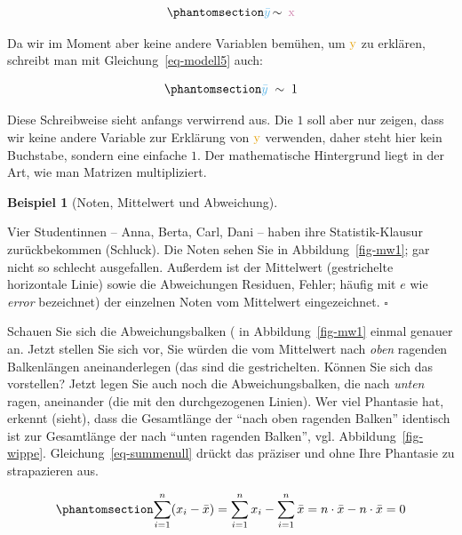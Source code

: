 \documentclass[
  letterpaper,
  twoside,
  open=any]{scrbook}
\theoremstyle{definition}
\theoremstyle{definition}
\newtheorem{example}{Beispiel}[chapter]
\theoremstyle{definition}
\theoremstyle{remark}
\begin{document}
\begin{equation}\phantomsection\label{eq-modell5a}{\color{modelcol}{\bar{y}} \color{black}  {\, \sim \,} \color{xcol}{\text{ x}}}\end{equation}

Da wir im Moment aber keine andere Variablen bemühen, um
\(\color{ycol}{\text{y}}\) zu erklären, schreibt man mit
Gleichung~\ref{eq-modell5} auch:

\begin{equation}\phantomsection\label{eq-modell5}{\color{modelcol}{\bar{y}}\;\;  \color{black}{\sim \; 1}}\end{equation}

Diese Schreibweise sieht anfangs verwirrend aus. Die \(1\) soll aber nur
zeigen, dass wir keine andere Variable zur Erklärung von
\(\color{ycol}{\text{y}}\) verwenden, daher steht hier kein Buchstabe,
sondern eine einfache \(1\). Der mathematische Hintergrund liegt in der
Art, wie man Matrizen multipliziert.

\begin{example}[Noten, Mittelwert und
Abweichung]\protect\hypertarget{exm-noten}{}\label{exm-noten}

Vier Studentinnen -- Anna, Berta, Carl, Dani -- haben ihre
Statistik-Klausur zurückbekommen (Schluck). Die Noten sehen Sie in
Abbildung~\ref{fig-mw1}; gar nicht so schlecht ausgefallen. Außerdem ist
der Mittelwert (gestrichelte horizontale Linie) sowie die Abweichungen
Residuen, Fehler; häufig mit \(e\) wie \emph{error} bezeichnet) der
einzelnen Noten vom Mittelwert eingezeichnet. \(\square\)

\end{example}

Schauen Sie sich die Abweichungsbalken ( in Abbildung~\ref{fig-mw1}
einmal genauer an. Jetzt stellen Sie sich vor, Sie würden die vom
Mittelwert nach \emph{oben} ragenden Balkenlängen aneinanderlegen (das
sind die gestrichelten. Können Sie sich das vorstellen? Jetzt legen Sie
auch noch die Abweichungsbalken, die nach \emph{unten} ragen, aneinander
(die mit den durchgezogenen Linien). Wer viel Phantasie hat, erkennt
(sieht), dass die Gesamtlänge der \enquote{nach oben ragenden Balken}
identisch ist zur Gesamtlänge der nach \enquote{unten ragenden Balken},
vgl. Abbildung~\ref{fig-wippe}. Gleichung~\ref{eq-summenull} drückt das
präziser und ohne Ihre Phantasie zu strapazieren aus.

\begin{equation}\phantomsection\label{eq-summenull}{\sum_{i=1}^n (x_i-\bar{x})=\sum_{i=1}^n x_i - \sum_{i=1}^n \bar{x} = n\cdot \bar{x} - n\cdot \bar{x}=0}\end{equation}
\end{document}
